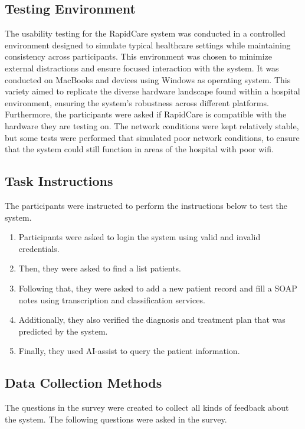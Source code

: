 \documentclass{article}
\begin{document}
\subsection{Testing Environment}

The usability testing for the RapidCare system was conducted in a controlled environment designed to simulate typical healthcare settings while maintaining consistency across participants. This environment was chosen to minimize external distractions and ensure focused interaction with the system. It was conducted on MacBooks and devices using Windows as operating system. This variety aimed to replicate the diverse hardware landscape found within a hospital environment, ensuring the system's robustness across different platforms. Furthermore, the participants were asked if RapidCare is compatible with the hardware they are testing on. The network conditions were kept relatively stable, but some tests were performed that simulated poor network conditions, to ensure that the system could still function in areas of the hospital with poor wifi.

\subsection{Task Instructions}

The participants were instructed to perform the instructions below to test the system.

\begin{enumerate}
    \item Participants were asked to login the system using valid and invalid credentials.
    \item Then, they were asked to find a list patients.
    \item Following that, they were asked to add a new patient record and fill a SOAP notes using transcription and classification services.
    \item Additionally, they also verified the diagnosis and treatment plan that was predicted by the system.
    \item Finally, they used AI-assist to query the patient information.
\end{enumerate}

\subsection{Data Collection Methods}

The questions in the survey were created to collect all kinds of feedback about the system. The following questions were asked in the survey.
\end{document}

